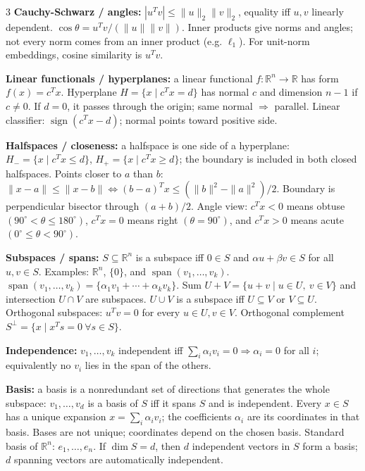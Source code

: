 \documentclass[10pt]{article}
\newcommand{\sub}[1]{\textbf{#1}}
\newcommand{\R}{\mathbb{R}}
\begin{document}
\begin{multicols*}{3}
\sub{Cauchy-Schwarz / angles:} \( |u^Tv|\le\|u\|_2\|v\|_2 \), equality iff \(u,v\) linearly dependent. \(\cos\theta=u^Tv/(\|u\|\|v\|)\). Inner products give norms and angles; not every norm comes from an inner product (e.g. \(\ell_1\)). For unit-norm embeddings, cosine similarity is \(u^Tv\).

\sub{Linear functionals / hyperplanes:} a linear functional \(f:\R^n\to\R\) has form \(f(x)=c^Tx\). Hyperplane \(H=\{x\mid c^Tx=d\}\) has normal \(c\) and dimension \(n-1\) if \(c\ne0\). If \(d=0\), it passes through the origin; same normal \(\Rightarrow\) parallel. Linear classifier: \(\operatorname{sign}(c^Tx-d)\); normal points toward positive side.

\sub{Halfspaces / closeness:} a halfspace is one side of a hyperplane:
\(H_-=\{x\mid c^Tx\le d\}\), \(H_+=\{x\mid c^Tx\ge d\}\); the boundary is included in both closed halfspaces. Points closer to \(a\) than \(b\): \(\|x-a\|\le\|x-b\|\iff (b-a)^Tx\le(\|b\|^2-\|a\|^2)/2\). Boundary is perpendicular bisector through $(a+b)/2$. Angle view:
\(c^Tx<0\) means obtuse \((90^\circ<\theta\le180^\circ)\),
\(c^Tx=0\) means right \((\theta=90^\circ)\), and
\(c^Tx>0\) means acute \((0^\circ\le\theta<90^\circ)\).

\sub{Subspaces / spans:} \(S\subseteq\R^n\) is a subspace iff \(0\in S\)
and \(\alpha u+\beta v\in S\) for all \(u,v\in S\). Examples:
\(\R^n\), \(\{0\}\), and \(\operatorname{span}(v_1,\ldots,v_k)\).
\(\operatorname{span}(v_1,\ldots,v_k)=\{\alpha_1v_1+\cdots+\alpha_kv_k\}\).
Sum \(U+V=\{u+v\mid u\in U,\ v\in V\}\) and intersection \(U\cap V\)
are subspaces. \(U\cup V\) is a subspace iff \(U\subseteq V\) or
\(V\subseteq U\). Orthogonal
subspaces: \(u^Tv=0\) for every \(u\in U,v\in V\). Orthogonal complement
\(S^\perp=\{x\mid x^Ts=0\ \forall s\in S\}\).

\sub{Independence:} \(v_1,\ldots,v_k\) independent iff
\(\sum_i\alpha_i v_i=0\Rightarrow \alpha_i=0\) for all \(i\);
equivalently no \(v_i\) lies in the span of the others.

\sub{Basis:} a basis is a nonredundant set of directions that generates
the whole subspace: \(v_1,\ldots,v_d\) is a basis of \(S\) iff it spans
\(S\) and is independent. Every \(x\in S\) has a unique expansion
\(x=\sum_i\alpha_i v_i\); the coefficients \(\alpha_i\) are its
coordinates in that basis. Bases are not unique; coordinates depend on
the chosen basis. Standard basis of \(\R^n\): \(e_1,\ldots,e_n\). If
\(\dim S=d\), then \(d\) independent vectors in \(S\) form a basis; \(d\)
spanning vectors are automatically independent.


\end{multicols*}
\end{document}
